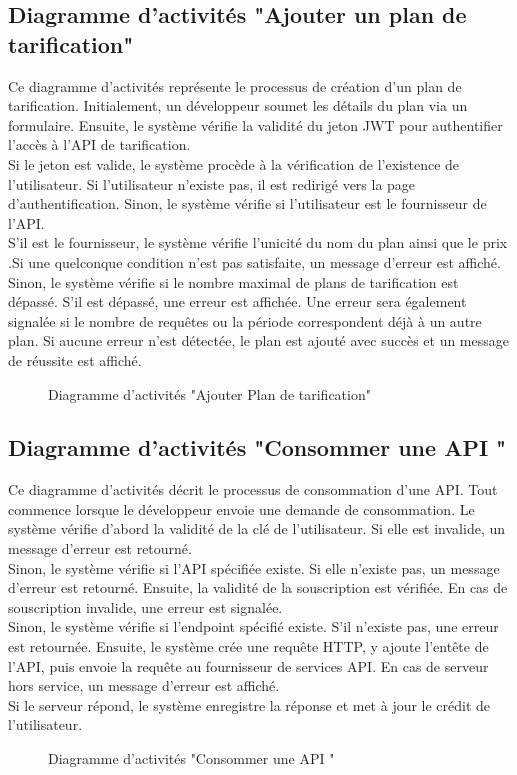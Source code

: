 \subsection{Diagramme d'activités "Ajouter un plan de tarification"}
Ce diagramme d'activités représente le processus de création d'un plan de tarification. Initialement, un développeur soumet les détails du plan via un formulaire. Ensuite, le système vérifie la validité du jeton JWT pour authentifier l'accès à l'API de tarification. \\
 Si le jeton est valide, le système procède à la vérification de l'existence de l'utilisateur. Si l'utilisateur n'existe pas, il est redirigé vers la page d'authentification. Sinon, le système vérifie si l'utilisateur est le fournisseur de l'API. \\
S'il est le fournisseur, le système vérifie l'unicité du nom  du plan ainsi que le prix .Si une quelconque condition n'est pas satisfaite, un message d'erreur est affiché. Sinon, le système vérifie si le nombre maximal de plans de tarification est dépassé. S'il est dépassé, une erreur est affichée. Une erreur sera également signalée si le nombre de requêtes ou la période correspondent déjà à un autre plan. Si aucune erreur n'est détectée, le plan est ajouté avec succès et un message de réussite est affiché.
\begin{figure}[H]
    \centering
    \caption{Diagramme d'activités "Ajouter Plan de tarification"}
    \label{fig:logo_tt}
\end{figure}
\pagebreak

\subsection{Diagramme d'activités "Consommer une API "}
Ce diagramme d'activités décrit le processus de consommation d'une API. Tout commence lorsque le développeur envoie une demande de consommation. Le système vérifie d'abord la validité de la clé de l'utilisateur. Si elle est invalide, un message d'erreur est retourné. \\
Sinon, le système vérifie si l'API spécifiée existe. Si elle n'existe pas, un message d'erreur est retourné. Ensuite, la validité de la souscription est vérifiée. En cas de souscription invalide, une erreur est signalée. \\
Sinon, le système vérifie si l'endpoint spécifié existe. S'il n'existe pas, une erreur est retournée. Ensuite, le système crée une requête HTTP, y ajoute l’entête de  l'API, puis envoie la requête au fournisseur de services API. En cas de serveur hors service, un message d'erreur est affiché. \\
Si le serveur répond, le système enregistre la réponse et met à jour le crédit de l'utilisateur.
\begin{figure}[H]
    \centering
    \caption{Diagramme d'activités "Consommer une API "}
    \label{fig:logo_tt}
\end{figure}
\pagebreak

